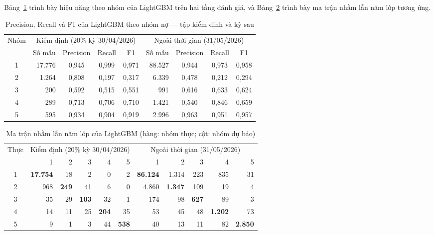 Bảng~\ref{tab:lgb-by-class} trình bày hiệu năng theo nhóm của LightGBM trên hai tầng đánh giá, và Bảng~\ref{tab:confusion-b} trình bày ma trận nhầm lẫn năm lớp tương ứng.

\begin{table}[H]
\centering
\caption{Precision, Recall và F1 của LightGBM theo nhóm nợ --- tập kiểm định và kỳ sau}
\label{tab:lgb-by-class}
\begin{tabular}{|c|r|c|c|c||r|c|c|c|}
\hline
\multirow{2}{*}{Nhóm} & \multicolumn{4}{c||}{Kiểm định (20\% kỳ 30/04/2026)} & \multicolumn{4}{c|}{Ngoài thời gian (31/05/2026)}\\
\cline{2-9}
 & Số mẫu & Precision & Recall & F1 & Số mẫu & Precision & Recall & F1\\
\hline
1 & 17.776 & 0,945 & 0,999 & 0,971 & 88.527 & 0,944 & 0,973 & 0,958\\
2 & 1.264 & 0,808 & 0,197 & 0,317 & 6.339 & 0,478 & 0,212 & 0,294\\
3 & 200 & 0,592 & 0,515 & 0,551 & 991 & 0,616 & 0,633 & 0,624\\
4 & 289 & 0,713 & 0,706 & 0,710 & 1.421 & 0,540 & 0,846 & 0,659\\
5 & 595 & 0,934 & 0,904 & 0,919 & 2.996 & 0,963 & 0,951 & 0,957\\
\hline
\end{tabular}
\end{table}

\begin{table}[H]
\centering
\caption{Ma trận nhầm lẫn năm lớp của LightGBM (hàng: nhóm thực; cột: nhóm dự báo)}
\label{tab:confusion-b}
\begin{tabular}{|c|r|r|r|r|r||r|r|r|r|r|}
\hline
\multirow{2}{*}{Thực} & \multicolumn{5}{c||}{Kiểm định (20\% kỳ 30/04/2026)} & \multicolumn{5}{c|}{Ngoài thời gian (31/05/2026)}\\
\cline{2-11}
 & 1 & 2 & 3 & 4 & 5 & 1 & 2 & 3 & 4 & 5\\
\hline
1 & \textbf{17.754} & 18 & 2 & 0 & 2 & \textbf{86.124} & 1.314 & 223 & 835 & 31\\
2 & 968 & \textbf{249} & 41 & 6 & 0 & 4.860 & \textbf{1.347} & 109 & 19 & 4\\
3 & 35 & 29 & \textbf{103} & 32 & 1 & 174 & 98 & \textbf{627} & 89 & 3\\
4 & 14 & 11 & 25 & \textbf{204} & 35 & 53 & 45 & 48 & \textbf{1.202} & 73\\
5 & 9 & 1 & 3 & 44 & \textbf{538} & 40 & 13 & 11 & 82 & \textbf{2.850}\\
\hline
\end{tabular}
\end{table}

